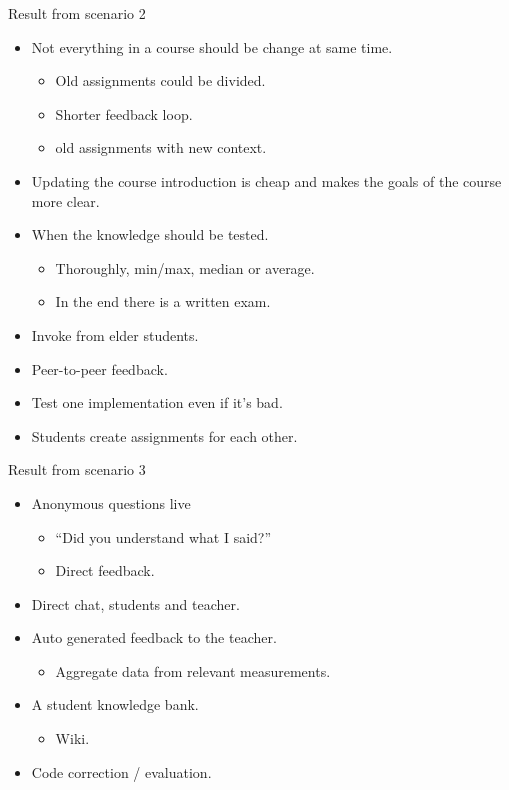Result from scenario 2
\begin{itemize}
\item Not everything in a course should be change at same time.
\begin{itemize}
\item Old assignments could be divided.
\item Shorter feedback loop.
\item old assignments with new context.
\end{itemize}
\item Updating the course introduction is cheap and makes the goals of the course more clear.
\item When the knowledge should be tested.
\begin{itemize}
\item Thoroughly, min/max, median or average.
\item In the end there is a written exam.
\end{itemize}
\item Invoke from elder students.
\item Peer-to-peer feedback.
\item Test one implementation even if it's bad.
\item Students create assignments for each other.
\end{itemize}

Result from scenario 3
\begin{itemize}
\item Anonymous questions live
\begin{itemize}
\item ``Did you understand what I said?''
\item Direct feedback.
\end{itemize}
\item Direct chat, students and teacher.
\item Auto generated feedback to the teacher.
\begin{itemize}
\item Aggregate data from relevant measurements.
\end{itemize}
\item A student knowledge bank.
\begin{itemize}
\item Wiki.
\end{itemize}
\item Code correction / evaluation.
\end{itemize}


